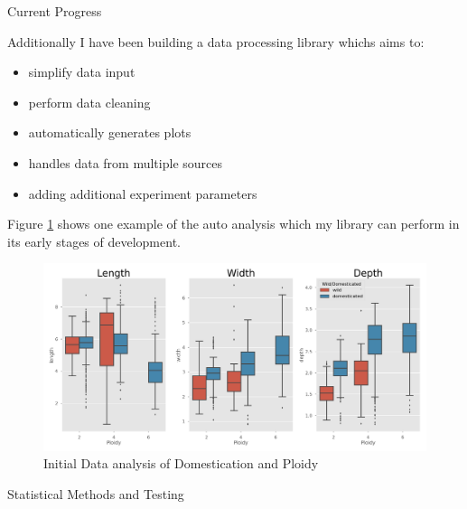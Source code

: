 \documentclass[final]{beamer}
\begin{document}
\begin{frame}{}
\begin{textblock}{28}
\begin{block}{Current Progress}
      \vspace{0.3cm}

      Additionally I have been building a data processing library whichs aims to:
      \begin{multicols}{2}

        \begin{itemize}
        \item simplify data input
        \item perform data cleaning
        \item automatically generates plots
        \end{itemize}
        \columnbreak
        \begin{itemize}
        \item handles data from multiple sources
        \item adding additional experiment parameters
        \end{itemize}

      \end{multicols}

      \vspace{0.3cm}

      Figure \ref{fig:initalboxplots} shows one example of the auto analysis which my library
      can perform in its early stages of development.

      \begin{figure}[htb]
        \centering
        \includegraphics[width=22cm]{domesticated.png}
        \caption{\label{fig:initalboxplots}Initial Data analysis of Domestication and Ploidy}
      \end{figure}

    \end{block}


    \begin{block}{Statistical Methods and Testing}


\end{block}
\end{textblock}
\end{frame}
\end{document}
